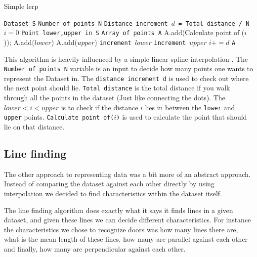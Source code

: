 \documentclass[a4paper, 10pt, conference]{ieeeconf}      %
\begin{document}
\begin{algorithm}
  \caption{\label{lerp}Simple lerp}
  \begin{algorithmic}[1]
      \State \texttt{Dataset S}
      \State \texttt{Number of points N}
      \State \texttt{Distance increment $d$ = Total distance / N}
      \State \texttt{$i = 0$}
      \State \texttt{Point lower,upper in S}
      \State \texttt{Array of points A}
      		\State A.add(Calculate point of ($i$));
      		\State A.add($lower$)
      		\State A.add($upper$)
      	\Else
      			\State \texttt{increment $lower$}
      			\State \texttt{increment $upper$}
      		\EndWhile
      	\EndIf
      	\State \texttt{$i += d$}
      \EndWhile
      \Return \texttt{A}
  \end{algorithmic}
\end{algorithm}

This algorithm is heavily influenced by a simple linear spline interpolation \cite{interpolation}. The \texttt{Number of points N} variable is an input to decide how many points one wants to represent the Dataset in. The \texttt{distance increment d} is used to check out where the next point should lie. \texttt{Total distance} is the total distance if you walk through all the points in the dataset (Just like connecting the dots). The \texttt{$lower < i < upper$} is to check if the distance $i$ lies in between the \texttt{lower} and \texttt{upper} points. \texttt{Calculate point of($i$)} is used to calculate the point that should lie on that distance.

\subsection{Line finding}
\label{sec:line_find}
The other approach to representing data was a bit more of an abstract approach. Instead of comparing the dataset against each other directly by using interpolation we decided to find characteristics within the dataset itself. 

The line finding algorithm does exactly what it says it finds lines in a given dataset, and given these lines we can decide different characteristics. For instance the characteristics we chose to recognize doors was how many lines there are, what is the mean length of these lines, how many are parallel against each other and finally, how many are perpendicular against each other.
\end{document}
